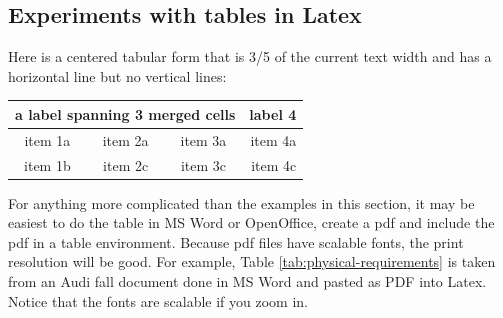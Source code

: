 \begin{remark} \color{blue}
\section*{Experiments with tables in Latex}

Here is a centered tabular form that is 3/5 of the current text width and has a horizontal line but no
vertical lines:

 \begin{center}  %
  \begin{tabular*}{0.6 \textwidth}%
     {@{\extracolsep{\fill}}cccr}
  \multicolumn{3}{c}{a label spanning 3 merged cells} & label 4  \\
  \hline  %
  item 1a  & item 2a  & item 3a  & item 4a  \\
  item 1b  & item 2c  & item 3c  & item 4c  \\
  \end{tabular*}
  \end{center}

\noindent For anything more complicated than the examples in this section, it may be easiest to do the table in MS Word or OpenOffice, create a pdf and include the pdf in a table environment. Because pdf files have scalable fonts, the print resolution will be good.
For example, Table \ref{tab:physical-requirements} is taken from an Audi fall document \cite{Audi2009Fall} done in MS Word and pasted as PDF into Latex. Notice that the fonts are scalable if you zoom in.


\end{remark}
